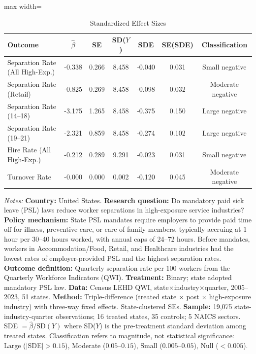 \begin{table}[htbp]
\centering
\caption{Standardized Effect Sizes}
\label{tab:sde}
\small
\begin{adjustbox}{max width=\textwidth}
\begin{tabular}{lcccccc}
\hline\hline
Outcome & $\hat{\beta}$ & SE & SD($Y$) & SDE & SE(SDE) & Classification \\
\hline
Separation Rate (All High-Exp.) & -0.338 & 0.266 & 8.458 & -0.040 & 0.031 & Small negative \\
Separation Rate (Retail) & -0.825 & 0.269 & 8.458 & -0.098 & 0.032 & Moderate negative \\
Separation Rate (14--18) & -3.175 & 1.265 & 8.458 & -0.375 & 0.150 & Large negative \\
Separation Rate (19--21) & -2.321 & 0.859 & 8.458 & -0.274 & 0.102 & Large negative \\
Hire Rate (All High-Exp.) & -0.212 & 0.289 & 9.291 & -0.023 & 0.031 & Small negative \\
Turnover Rate & -0.000 & 0.000 & 0.002 & -0.120 & 0.045 & Moderate negative \\
\hline\hline
\end{tabular}
\end{adjustbox}
\begin{tablenotes}[flushleft]
\small
\item \textit{Notes:} \textbf{Country:} United States. \textbf{Research question:} Do mandatory paid sick leave (PSL) laws reduce worker separations in high-exposure service industries? \textbf{Policy mechanism:} State PSL mandates require employers to provide paid time off for illness, preventive care, or care of family members, typically accruing at 1 hour per 30--40 hours worked, with annual caps of 24--72 hours. Before mandates, workers in Accommodation/Food, Retail, and Healthcare industries had the lowest rates of employer-provided PSL and the highest separation rates. \textbf{Outcome definition:} Quarterly separation rate per 100 workers from the Quarterly Workforce Indicators (QWI). \textbf{Treatment:} Binary; state adopted mandatory PSL law. \textbf{Data:} Census LEHD QWI, state$\times$industry$\times$quarter, 2005--2023, 51 states. \textbf{Method:} Triple-difference (treated state $\times$ post $\times$ high-exposure industry) with three-way fixed effects. State-clustered SEs. \textbf{Sample:} 19,075 state-industry-quarter observations; 16 treated states, 35 controls; 5 NAICS sectors. SDE $= \hat{\beta} / \text{SD}(Y)$ where SD($Y$) is the pre-treatment standard deviation among treated states. Classification refers to magnitude, not statistical significance: Large ($|$SDE$| > 0.15$), Moderate ($0.05$--$0.15$), Small ($0.005$--$0.05$), Null ($< 0.005$).
\end{tablenotes}
\end{table}
